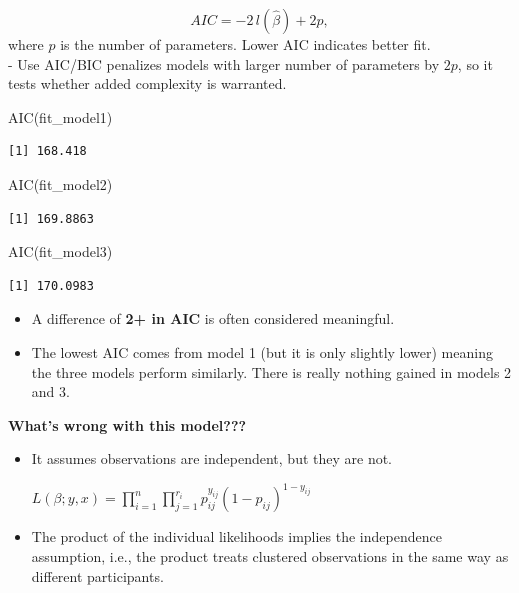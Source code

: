 \documentclass[
  letterpaper,
  DIV=11,
  numbers=noendperiod]{scrreprt}
\newenvironment{Shaded}{\begin{snugshade}}{\end{snugshade}}
\newcommand{\FunctionTok}[1]{\textcolor[rgb]{0.28,0.35,0.67}{#1}}
\newcommand{\NormalTok}[1]{\textcolor[rgb]{0.00,0.23,0.31}{#1}}
\providecommand{\tightlist}{%
  \setlength{\itemsep}{0pt}\setlength{\parskip}{0pt}}\usepackage{longtable,booktabs,array}
\begin{document}
\[
    AIC = -2 \, l(\hat{\beta}) + 2p,
\] where \(p\) is the number of parameters. Lower AIC indicates better
fit.\\
- Use AIC/BIC penalizes models with larger number of parameters by
\(2p\), so it tests whether added complexity is warranted.

\begin{Shaded}
\begin{Highlighting}[]
\FunctionTok{AIC}\NormalTok{(fit\_model1)}
\end{Highlighting}
\end{Shaded}

\begin{verbatim}
[1] 168.418
\end{verbatim}

\begin{Shaded}
\begin{Highlighting}[]
\FunctionTok{AIC}\NormalTok{(fit\_model2)}
\end{Highlighting}
\end{Shaded}

\begin{verbatim}
[1] 169.8863
\end{verbatim}

\begin{Shaded}
\begin{Highlighting}[]
\FunctionTok{AIC}\NormalTok{(fit\_model3)}
\end{Highlighting}
\end{Shaded}

\begin{verbatim}
[1] 170.0983
\end{verbatim}

\begin{itemize}
\tightlist
\item
  A difference of \textbf{2+ in AIC} is often considered meaningful.\\
\item
  The lowest AIC comes from model 1 (but it is only slightly lower)
  meaning the three models perform similarly. There is really nothing
  gained in models 2 and 3.
\end{itemize}

\textbf{What's wrong with this model???}

\begin{itemize}
\item
  It assumes observations are independent, but they are not.

  \(L(\beta; y,x) = \prod_{i=1}^n \prod_{j=1}^{r_i} p_{ij}^{y_{ij}} (1-p_{ij})^{1-y_{ij}}\)
\item
  The product of the individual likelihoods implies the independence
  assumption, i.e., the product treats clustered observations in the
  same way as different participants.
\end{itemize}
\end{document}
